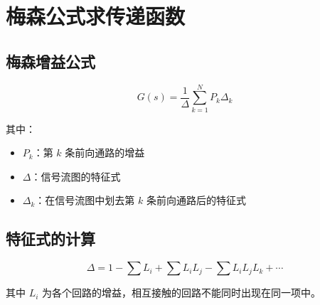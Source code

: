 \section{梅森公式求传递函数}

\subsection{梅森增益公式}
\[G(s) = \frac{1}{\Delta} \sum_{k=1}^{N} P_k \Delta_k\]

其中：
\begin{itemize}
    \item $P_k$：第 $k$ 条前向通路的增益
    \item $\Delta$：信号流图的特征式
    \item $\Delta_k$：在信号流图中划去第 $k$ 条前向通路后的特征式
\end{itemize}

\subsection{特征式的计算}
\[\Delta = 1 - \sum L_i + \sum L_i L_j - \sum L_i L_j L_k + \cdots\]

其中 $L_i$ 为各个回路的增益，相互接触的回路不能同时出现在同一项中。
